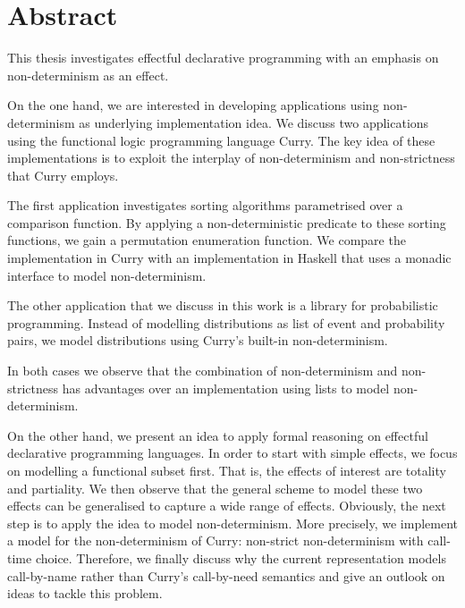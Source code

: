 %
\begingroup
\let\cleardoublepage\clearpage

\chapter*{Abstract}
\label{sec:abstract}
This thesis investigates effectful declarative programming with an emphasis on non\--determinism as an effect.

On the one hand, we are interested in developing applications using non\--determinism as underlying implementation idea.
We discuss two applications using the functional logic programming language Curry.
The key idea of these implementations is to exploit the interplay of non\--determinism and non\--strictness that Curry employs.

The first application investigates sorting algorithms parametrised over a comparison function.
By applying a non\--deterministic predicate to these sorting functions, we gain a permutation enumeration function.
We compare the implementation in Curry with an implementation in Haskell that uses a monadic interface to model non\--determinism.

The other application that we discuss in this work is a library for probabilistic programming.
Instead of modelling distributions as list of event and probability pairs, we model distributions using Curry's built\--in non\--determinism.

In both cases we observe that the combination of non\--determinism and non\--strictness has advantages over an implementation using lists to model non\--determinism.

On the other hand, we present an idea to apply formal reasoning on effectful declarative programming languages.
In order to start with simple effects, we focus on modelling a functional subset first.
That is, the effects of interest are totality and partiality.
We then observe that the general scheme to model these two effects can be generalised to capture a wide range of effects.
Obviously, the next step is to apply the idea to model non\--determinism.
More precisely, we implement a model for the non\--determinism of Curry: non\--strict non\--determinism with call\--time choice.
Therefore, we finally discuss why the current representation models call\--by\--name rather than Curry's call\--by\--need semantics and give an outlook on ideas to tackle this problem.

